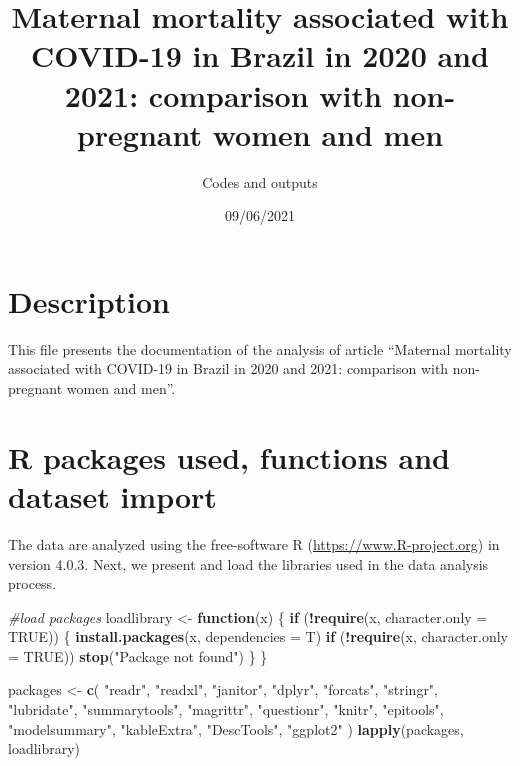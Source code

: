 \documentclass[
]{article}
\title{Maternal mortality associated with COVID-19 in Brazil in 2020 and 2021:
comparison with non-pregnant women and men}
\author{Codes and outputs}
\date{09/06/2021}
\newenvironment{Shaded}{\begin{snugshade}}{\end{snugshade}}
\newcommand{\CommentTok}[1]{\textcolor[rgb]{0.56,0.35,0.01}{\textit{#1}}}
\newcommand{\ControlFlowTok}[1]{\textcolor[rgb]{0.13,0.29,0.53}{\textbf{#1}}}
\newcommand{\DataTypeTok}[1]{\textcolor[rgb]{0.13,0.29,0.53}{#1}}
\newcommand{\KeywordTok}[1]{\textcolor[rgb]{0.13,0.29,0.53}{\textbf{#1}}}
\newcommand{\NormalTok}[1]{#1}
\newcommand{\OperatorTok}[1]{\textcolor[rgb]{0.81,0.36,0.00}{\textbf{#1}}}
\newcommand{\OtherTok}[1]{\textcolor[rgb]{0.56,0.35,0.01}{#1}}
\newcommand{\StringTok}[1]{\textcolor[rgb]{0.31,0.60,0.02}{#1}}
\begin{document}
\maketitle

\hypertarget{description}{%
\section{Description}\label{description}}

This file presents the documentation of the analysis of article
``Maternal mortality associated with COVID-19 in Brazil in 2020 and
2021: comparison with non-pregnant women and men''.

\hypertarget{r-packages-used-functions-and-dataset-import}{%
\section{R packages used, functions and dataset
import}\label{r-packages-used-functions-and-dataset-import}}

The data are analyzed using the free-software R
(\url{https://www.R-project.org}) in version 4.0.3. Next, we present and
load the libraries used in the data analysis process.

\begin{Shaded}
\begin{Highlighting}[]
\CommentTok{#load packages}
\NormalTok{loadlibrary <-}\StringTok{ }\ControlFlowTok{function}\NormalTok{(x) \{}
  \ControlFlowTok{if}\NormalTok{ (}\OperatorTok{!}\KeywordTok{require}\NormalTok{(x, }\DataTypeTok{character.only =} \OtherTok{TRUE}\NormalTok{)) \{}
    \KeywordTok{install.packages}\NormalTok{(x, }\DataTypeTok{dependencies =}\NormalTok{ T)}
    \ControlFlowTok{if}\NormalTok{ (}\OperatorTok{!}\KeywordTok{require}\NormalTok{(x, }\DataTypeTok{character.only =} \OtherTok{TRUE}\NormalTok{))}
      \KeywordTok{stop}\NormalTok{(}\StringTok{"Package not found"}\NormalTok{)}
\NormalTok{  \}}
\NormalTok{\}}

\NormalTok{packages <-}
\StringTok{  }\KeywordTok{c}\NormalTok{(}
    \StringTok{"readr"}\NormalTok{,}
    \StringTok{"readxl"}\NormalTok{,}
    \StringTok{"janitor"}\NormalTok{,}
    \StringTok{"dplyr"}\NormalTok{,}
    \StringTok{"forcats"}\NormalTok{,}
    \StringTok{"stringr"}\NormalTok{,}
    \StringTok{"lubridate"}\NormalTok{,}
    \StringTok{"summarytools"}\NormalTok{,}
    \StringTok{"magrittr"}\NormalTok{,}
    \StringTok{"questionr"}\NormalTok{, }
    \StringTok{"knitr"}\NormalTok{,}
    \StringTok{"epitools"}\NormalTok{, }
    \StringTok{"modelsummary"}\NormalTok{, }
    \StringTok{"kableExtra"}\NormalTok{, }
    \StringTok{"DescTools"}\NormalTok{, }
    \StringTok{"ggplot2"}
\NormalTok{    )}
\KeywordTok{lapply}\NormalTok{(packages, loadlibrary)}
\end{Highlighting}
\end{Shaded}
\end{document}
